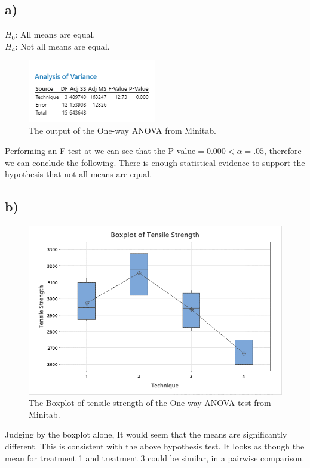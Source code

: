 \documentclass{article}
\begin{document}
\subsection*{a)}
$H_0$: All means are equal. \\
$H_a$: Not all means are equal. \\
\begin{figure}[h]
    \centering
    \includegraphics[width=0.5\textwidth]{./images/2_a.png}
    \caption{The output of the One-way ANOVA from Minitab.}
    \label{fig:2_a}
\end{figure}
Performing an F test at we can see that the P-value$ = 0.000 < \alpha = .05$, therefore we can conclude the following.
There is enough statistical evidence to support the hypothesis that not all means are equal.

\subsection*{b)}
\begin{figure}[h]
    \centering
    \includegraphics[width=1\textwidth]{./images/2_b.png}
    \caption{The Boxplot of tensile strength of the One-way ANOVA test from Minitab.}
    \label{fig:2_b}
\end{figure}
Judging by the boxplot alone, It would seem that the means are significantly different.
This is consistent with the above hypothesis test.
It looks as though the mean for treatment 1 and treatment 3 could be similar, in a pairwise comparison.
\end{document}
